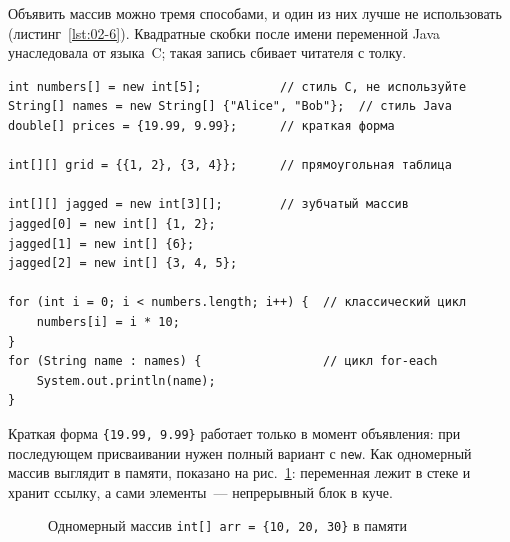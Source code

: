 Объявить массив можно тремя способами, и один из них лучше не использовать
(листинг~\ref{lst:02-6}). Квадратные скобки после имени переменной Java
унаследовала от языка~C; такая запись сбивает читателя с толку.

\begin{listing}[H]
\begin{verbatim}
int numbers[] = new int[5];           // стиль C, не используйте
String[] names = new String[] {"Alice", "Bob"};  // стиль Java
double[] prices = {19.99, 9.99};      // краткая форма

int[][] grid = {{1, 2}, {3, 4}};      // прямоугольная таблица

int[][] jagged = new int[3][];        // зубчатый массив
jagged[0] = new int[] {1, 2};
jagged[1] = new int[] {6};
jagged[2] = new int[] {3, 4, 5};

for (int i = 0; i < numbers.length; i++) {  // классический цикл
    numbers[i] = i * 10;
}
for (String name : names) {                 // цикл for-each
    System.out.println(name);
}
\end{verbatim}
\caption{Способы объявления и создания массивов}
\label{lst:02-6}
\end{listing}

Краткая форма \texttt{\{19.99, 9.99\}} работает только в момент объявления:
при последующем присваивании нужен полный вариант с \texttt{new}. Как
одномерный массив выглядит в памяти, показано на рис.~\ref{fig:02-4}:
переменная лежит в стеке и хранит ссылку, а сами элементы~--- непрерывный блок
в куче.

\begin{figure}[htbp]\centering
{}
\caption{Одномерный массив \texttt{int[] arr = \{10, 20, 30\}} в памяти}
\label{fig:02-4}
\end{figure}

